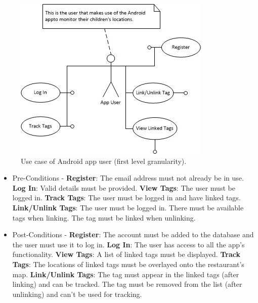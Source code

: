 \documentclass[11pt,titlepage]{article} %
\begin{document}
\begin{figure}[H]
\centering
\includegraphics[scale=1]{AppUser.jpg}
\caption{Use case of Android app user (first level granularity).}
\end{figure}

\begin{itemize}
\item Pre-Conditions - \textbf{Register}: The email address must not already be in use. \textbf{Log In}: Valid details must be provided. \textbf{View Tags}: The user must be logged in. \textbf{Track Tags}: The user must be logged in and have linked tags. \textbf{Link/Unlink Tags}: The user must be logged in. There must be available tags when linking. The tag must be linked when unlinking.
\item Post-Conditions - \textbf{Register}: The account must be added to the database and the user must use it to log in. \textbf{Log In}: The user has access to all the app's functionality. \textbf{View Tags}: A list of linked tags must be displayed. \textbf{Track Tags}: The locations of linked tags must be overlayed onto the restaurant's map. \textbf{Link/Unlink Tags}: The tag must appear in the linked tags (after linking) and can be tracked. The tag must be removed from the list (after unlinking) and can't be used for tracking.
\end{itemize}
\end{document}
